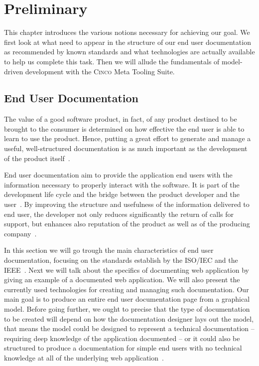 
\chapter{Preliminary}\label{ch:Basis}

This chapter introduces the various notions necessary for achieving our goal. We first look at what need to appear in the structure of our end user documentation as recommended by known standards and what technologies are actually available to help us complete this task. Then we will allude the fundamentals of model-driven development with the \textsc{Cinco} Meta Tooling Suite.

\section{End User Documentation}\label{sec:endUserDoc}

The value of a good software product, in fact, of any product destined to be brought to the consumer is determined on how effective the end user is able to learn to use the product. Hence, putting a great effort to generate and manage a useful, well-structured documentation is as much important as the development of the product itself~\cite{ISO-IEC-IEEE}. 

End user documentation aim to provide the application end users with the information necessary to properly interact with the software. It is part of the development life cycle and the bridge between the product developer and the user~\cite{9238529}. By improving the structure and usefulness of the information delivered to end user, the developer not only reduces significantly the return of calls for support, but enhances also reputation of the product as well as of the producing company~\cite{ieee5712775}.

In this section we will go trough the main characteristics of end user documentation, focusing on the standards establish by the ISO/IEC and the IEEE~\cite{ieee5712775, ISO-IEC-IEEE}. Next we will talk about the specifics of documenting web application by giving an example of a documented web application. We will also present the currently used technologies for creating and managing such documentation. Our main goal is to produce an entire end user documentation page from a graphical model. Before going further, we ought to precise that the type of documentation to be created will depend on how the documentation designer lays out the model, that means the model could be designed to represent a technical documentation -- requiring deep knowledge of the application documented -- or it could also be structured to produce a documentation for simple end users with no technical knowledge at all of the underlying web application~\cite{ieee6081814}.


